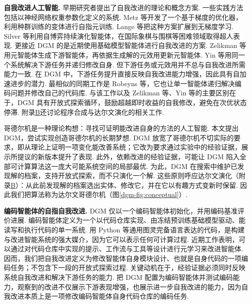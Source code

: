 \textbf{自我改进人工智能.} 早期研究者提出了自我改进的理论和概念方案\cite{dgm-good1966speculations,dgm-schmidhuber1987evolutionary,dgm-schmidhuber2007godel}. 一些实践方法包括以神经网络权重参数化定义的系统\cite{dgm-schmidhuber1993self,dgm-hall2007self,dgm-hobbhahn2025swebenchmini,dgm-kirsch2022self,dgm-irie2022modern,dgm-irie2025metalearning,dgm-lu2023arbitrary,dgm-havrilla2024glore}. Metz 等\cite{dgm-metz2021training}开发了一个基于梯度的优化器，利用种群训练\cite{dgm-jaderberg2017population}的变体进行自指元训练. Lange 等\cite{dgm-lange2023discovering}把这种方案扩展到无梯度学习. Silver 等\cite{dgm-silver2017mastering}利用自博弈持续演化智能体，在国际象棋与围棋等困难领域取得超人表现. 更接近 DGM 的是近期使用基础模型智能体进行自我改进的方案\cite{dgm-yin2024g,dgm-robeyns2025self,dgm-hu2024self,dgm-zelikman2024self,dgm-huang2022large,dgm-singh2023beyond}. Zelikman 等\cite{dgm-zelikman2024self}用元智能体生成下游智能体，再依据生成解的元效用更新元智能体. Yin 等\cite{dgm-yin2024g}用同一个系统解决下游任务并递归修改自身. 但下游任务或元效用并不总与自我改进所需能力一致. 在 DGM 中，下游任务提升直接反映自我改进能力增强，因此具有自加速进步的潜力. 最相似的同期工作是 Robeyns 等\cite{dgm-robeyns2025self}，它也让单一智能体递归解决编码问题并修改自己的代码库. 与该工作以及 Zelikman 等、Yin 等的主要区别在于，DGM 具有开放式探索循环，鼓励超越即时收益的自我修改，避免在次优状态停滞. 附录\hyperref[dgm-app:related]{B}还讨论程序合成与达尔文演化的相关工作.

哥德尔机是一种理论构想：寻找可证明能改进自身的方法的人工智能\cite{dgm-schmidhuber2007godel}. 本文提出 DGM，尝试实现创造哥德尔机的长期梦想. DGM 放宽了哥德尔机不切实际的要求，即从理论上证明一项变化能改善系统；它改为要求通过实验中的经验证据，展示所提议的新版本提升了表现. 此外，依赖改进的经验证据，可能让 DGM 陷入全部可计算算法这一庞大可能系统空间的局部最优. 为此，DGM 在搜索中维护已发现解的档案，支持开放式探索，而不只演化一个解. 这些原则呼应达尔文演化\cite{dgm-darwin2023origin}（附录\hyperref[dgm-app:related]{B}）：从此前发现解的档案选出实体、修改它，并在它以有趣方式变新时保留\cite{dgm-zhang2024omni,dgm-faldor2025omni,dgm-stanley2015greatness}. 因此我们把算法称为达尔文哥德尔机（图\ref{dgm-fig:conceptual}）.

\textbf{编码智能体的自指自我改进.} DGM 仅以一个编码智能体初始化，并用编码基准评价进展. 编码智能体定义为一个以代码仓库实现、由冻结预训练基础模型驱动、能读写和执行代码的单一系统. 用 Python 等通用图灵完备语言表达的代码，是构建与改进智能系统的强大媒介，因为它可以表示任何可计算过程. 近期工作\cite{dgm-hu2025automated,dgm-zhang2024aflow}表明，可以通过对代码仓库中实现的提示、工作流与工具等设计进行元学习来改进智能体. 因而，我们把自我改进定义为修改智能体自身模块设计、也就是自身代码的一项编码任务；不包含下一段的开放式探索过程. 关键动机在于，经验证据必须同时反映系统自我改进和解决下游任务的能力. 把 DGM 配置为编码智能体并测试编码能力，观察到的改进不仅展示下游表现增强，也展示进一步自我改进的能力，因为自我改进本质上是一项修改编码智能体自身代码仓库的编码任务.


